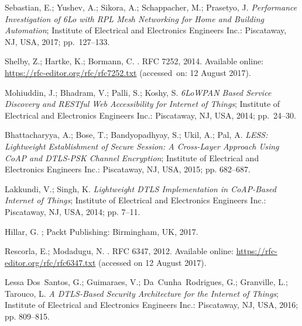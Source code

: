 \documentclass[symmetry,article,accept,moreauthors,pdftex10pt,a4paper]{mdpi}
\begin{document}
\begin{thebibliography}{999}
Sebastian, E.; Yushev, A.; Sikora, A.; Schappacher, M.; Prasetyo, J.
\newblock \emph{Performance Investigation of 6Lo with RPL Mesh Networking for Home
	and Building Automation};
\newblock Institute of Electrical and Electronics Engineers Inc.: Piscataway, NJ, USA, 2017; pp.~127--133.

Shelby, Z.; Hartke, K.; Bormann, C.
.
\newblock RFC 7252, 2014. Available online: \url{https://rfc-editor.org/rfc/rfc7252.txt} (accessed~on: 12 August 2017).

Mohiuddin, J.; Bhadram, V.; Palli, S.; Koshy, S.
\newblock \emph{6LoWPAN Based Service Discovery and RESTful Web Accessibility for
	Internet of Things};
\newblock Institute of Electrical and Electronics Engineers Inc.: Piscataway, NJ, USA, 2014; pp.~24--30.

Bhattacharyya, A.; Bose, T.; Bandyopadhyay, S.; Ukil, A.; Pal, A.
\newblock \emph{LESS: Lightweight Establishment of Secure Session: A Cross-Layer
	Approach Using CoAP and DTLS-PSK Channel Encryption};
\newblock Institute of Electrical and Electronics Engineers Inc.: Piscataway, NJ, USA, 2015; pp.
682--687.

Lakkundi, V.; Singh, K.
\newblock \emph{Lightweight DTLS Implementation in CoAP-Based Internet of Things};
\newblock Institute of Electrical and Electronics Engineers Inc.: Piscataway, NJ, USA, 2014; pp.
7--11.

Hillar, G.
; Packt Publishing: Birmingham, UK, 2017.

Rescorla, E.; Modadugu, N.
.
\newblock RFC 6347, 2012. Available online: \url{https://rfc-editor.org/rfc/rfc6347.txt} (accessed on 12 August 2017).%

Lessa Dos~Santos, G.; Guimaraes, V.; Da~Cunha~Rodrigues, G.; Granville, L.;
Tarouco, L.
\newblock \emph{A DTLS-Based Security Architecture for the Internet of Things};
\newblock Institute of Electrical and Electronics Engineers Inc.: Piscataway, NJ, USA, 2016; pp. 809--815.


\end{thebibliography}
\end{document}
